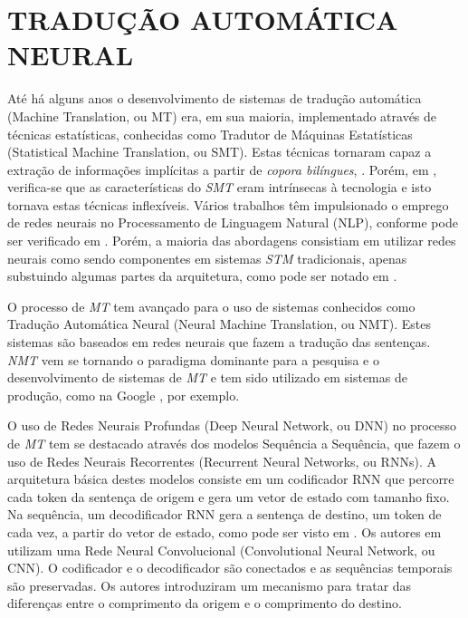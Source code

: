 \section{TRADU\c C\~AO AUTOM\'ATICA NEURAL}

At\'e h\'a alguns anos o desenvolvimento de sistemas de tradu\c c\~ao autom\'atica 
(Machine Translation, ou MT) era, em sua maioria, implementado atrav\'es de t\'ecnicas 
estat\'isticas, conhecidas como Tradutor de M\'aquinas Estat\'isticas 
(Statistical Machine Translation, ou SMT).
Estas t\'ecnicas tornaram capaz a extra\c c\~ao de informa\c c\~oes impl\'icitas a partir de
\emph{copora bil\'ingues}, \cite{brown:1993}. Por\'em, em \textcite{maruf:2021}, verifica-se que 
as caracter\'isticas do \emph{SMT} eram intr\'insecas \`a tecnologia e isto tornava estas 
t\'ecnicas inflex\'iveis. V\'arios trabalhos t\^em impulsionado o emprego de redes 
neurais no Processamento de Linguagem Natural (NLP), conforme pode ser verificado em 
\textcite{goldberg:2016}. Por\'em, a maioria das abordagens consistiam em utilizar redes neurais 
como sendo componentes em sistemas \emph{STM} tradicionais, apenas substuindo algumas 
partes da arquitetura, como pode ser notado em \textcite{stahlberg:2020}.

O processo de \emph{MT} tem avan\c cado para o uso de sistemas conhecidos como Tradu\c c\~ao 
Autom\'atica Neural (Neural Machine Translation, ou NMT).
Estes sistemas s\~ao baseados em redes neurais que fazem a tradu\c c\~ao das senten\c cas.
\emph{NMT} vem se tornando o paradigma dominante para a pesquisa e o desenvolvimento 
de sistemas de \emph{MT} e tem sido utilizado em sistemas de produ\c c\~ao, como na Google
\cite{wu:2016}, por exemplo.

O uso de Redes Neurais Profundas (Deep Neural Network, ou DNN) no processo de \emph{MT}
tem se destacado atrav\'es dos modelos Sequ\^encia a Sequ\^encia, que fazem o uso de 
Redes Neurais Recorrentes (Recurrent Neural Networks, ou RNNs).
A arquitetura b\'asica destes modelos consiste em um codificador RNN que percorre cada 
token da senten\c ca de origem e gera um vetor de estado com tamanho fixo.
Na sequ\^encia, um decodificador RNN gera a senten\c ca de destino, um token de cada vez,
a partir do vetor de estado, como pode ser visto em \textcite{sutskever:2014}.
Os autores em \textcite{kalchbrenner:2016} utilizam uma Rede Neural Convolucional (Convolutional 
Neural Network, ou CNN). O codificador e o decodificador s\~ao conectados e as sequ\^encias 
temporais s\~ao preservadas. Os autores introduziram um mecanismo para tratar das 
diferen\c cas entre o comprimento da origem e o comprimento do destino.

